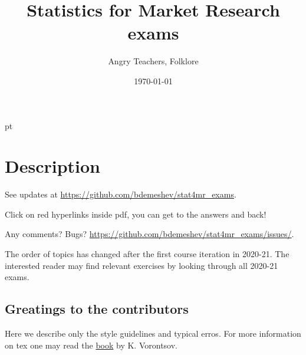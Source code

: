 \documentclass[11pt, a4paper]{article}
\title{Statistics for Market Research exams}
\date{\today}
\author{Angry Teachers, Folklore}
\theoremstyle{definition}
\begin{document}
\maketitle

\tableofcontents{}


 pt %

\clearpage
\section*{Description}

See updates at \url{https://github.com/bdemeshev/stat4mr_exams}.

Click on red hyperlinks inside pdf, you can get to the answers and back!


Any comments? Bugs?
\url{https://github.com/bdemeshev/stat4mr_exams/issues/}.

The order of topics has changed after the first course iteration in 2020-21.
The interested reader may find relevant exercises by looking through all 2020-21 exams. 


\subsection*{Greatings to the contributors}

Here we describe only the style guidelines and typical erros. 
For more information on tex one may read the 
\href{http://www.ccas.ru/voron/download/voron05latex.pdf}{book} by K. Vorontsov.
\end{document}

